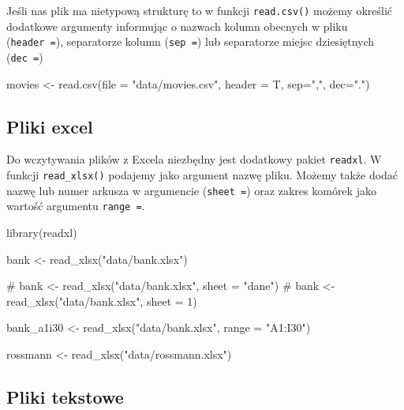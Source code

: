 \documentclass[
  letterpaper,
  DIV=11,
  numbers=noendperiod]{scrreprt}
\newenvironment{Shaded}{\begin{snugshade}}{\end{snugshade}}
\newcommand{\AttributeTok}[1]{\textcolor[rgb]{0.40,0.45,0.13}{#1}}
\newcommand{\CommentTok}[1]{\textcolor[rgb]{0.37,0.37,0.37}{#1}}
\newcommand{\FunctionTok}[1]{\textcolor[rgb]{0.28,0.35,0.67}{#1}}
\newcommand{\NormalTok}[1]{\textcolor[rgb]{0.00,0.23,0.31}{#1}}
\newcommand{\OtherTok}[1]{\textcolor[rgb]{0.00,0.23,0.31}{#1}}
\newcommand{\StringTok}[1]{\textcolor[rgb]{0.13,0.47,0.30}{#1}}
\begin{document}
Jeśli nas plik ma nietypową strukturę to w funkcji \texttt{read.csv()}
możemy określić dodatkowe argumenty informując o nazwach kolumn obecnych
w pliku (\texttt{header\ =}), separatorze kolumn (\texttt{sep\ =}) lub
separatorze miejsc dziesiętnych (\texttt{dec\ =})

\begin{Shaded}
\begin{Highlighting}[]
\NormalTok{movies }\OtherTok{\textless{}{-}} \FunctionTok{read.csv}\NormalTok{(}\AttributeTok{file =} \StringTok{"data/movies.csv"}\NormalTok{, }\AttributeTok{header =}\NormalTok{ T, }\AttributeTok{sep=}\StringTok{","}\NormalTok{, }\AttributeTok{dec=}\StringTok{"."}\NormalTok{)}
\end{Highlighting}
\end{Shaded}

\hypertarget{pliki-excel}{%
\subsection{Pliki excel}\label{pliki-excel}}

Do wczytywania plików z Excela niezbędny jest dodatkowy pakiet
\texttt{readxl}. W funkcji \texttt{read\_xlsx()} podajemy jako argument
nazwę pliku. Możemy także dodać nazwę lub numer arkusza w argumencie
(\texttt{sheet\ =}) oraz zakres komórek jako wartość argumentu
\texttt{range\ =}.

\begin{Shaded}
\begin{Highlighting}[]
\FunctionTok{library}\NormalTok{(readxl)}

\NormalTok{bank }\OtherTok{\textless{}{-}} \FunctionTok{read\_xlsx}\NormalTok{(}\StringTok{"data/bank.xlsx"}\NormalTok{)}

\CommentTok{\# bank \textless{}{-} read\_xlsx("data/bank.xlsx", sheet = "dane")}
\CommentTok{\# bank \textless{}{-} read\_xlsx("data/bank.xlsx", sheet = 1)}

\NormalTok{bank\_a1i30 }\OtherTok{\textless{}{-}} \FunctionTok{read\_xlsx}\NormalTok{(}\StringTok{"data/bank.xlsx"}\NormalTok{, }\AttributeTok{range =} \StringTok{"A1:I30"}\NormalTok{)}

\NormalTok{rossmann }\OtherTok{\textless{}{-}} \FunctionTok{read\_xlsx}\NormalTok{(}\StringTok{"data/rossmann.xlsx"}\NormalTok{)}
\end{Highlighting}
\end{Shaded}

\hypertarget{pliki-tekstowe}{%
\subsection{Pliki tekstowe}\label{pliki-tekstowe}}
\end{document}
